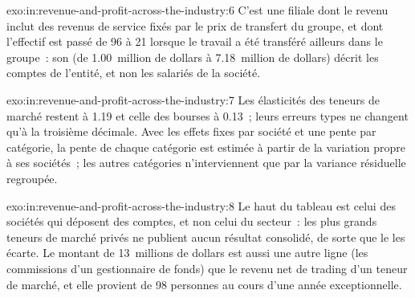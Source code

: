 \begin{solution}{exo:in:revenue-and-profit-across-the-industry:6}
C'est une filiale dont le revenu inclut des revenus de service fixés par le prix de transfert du groupe, et dont
l'effectif est passé de 96 à 21 lorsque le travail a été transféré ailleurs dans le groupe~: son  (de 1.00~million de dollars à 7.18~million de dollars) décrit les
comptes de l'entité, et non les salariés de la société.
\end{solution}

\begin{solution}{exo:in:revenue-and-profit-across-the-industry:7}
Les élasticités des teneurs de marché restent à 1.19 et celle des bourses à 0.13~; leurs erreurs types ne changent qu'à la troisième
décimale. Avec les effets fixes par société et une pente par catégorie, la pente de chaque catégorie est estimée à partir de
la variation propre à ses sociétés~; les autres catégories n'interviennent que par la variance résiduelle regroupée.
\end{solution}

\begin{solution}{exo:in:revenue-and-profit-across-the-industry:8}
Le haut du tableau est celui des sociétés qui déposent des comptes, et non celui du secteur~: les plus grands teneurs de marché privés ne publient aucun
résultat consolidé, de sorte que le  les écarte. Le montant de 13~millions de dollars est aussi une autre ligne (les commissions d'un gestionnaire de fonds)
que le revenu net de trading d'un teneur de marché, et elle provient de 98 personnes au cours d'une année exceptionnelle.
\end{solution}

